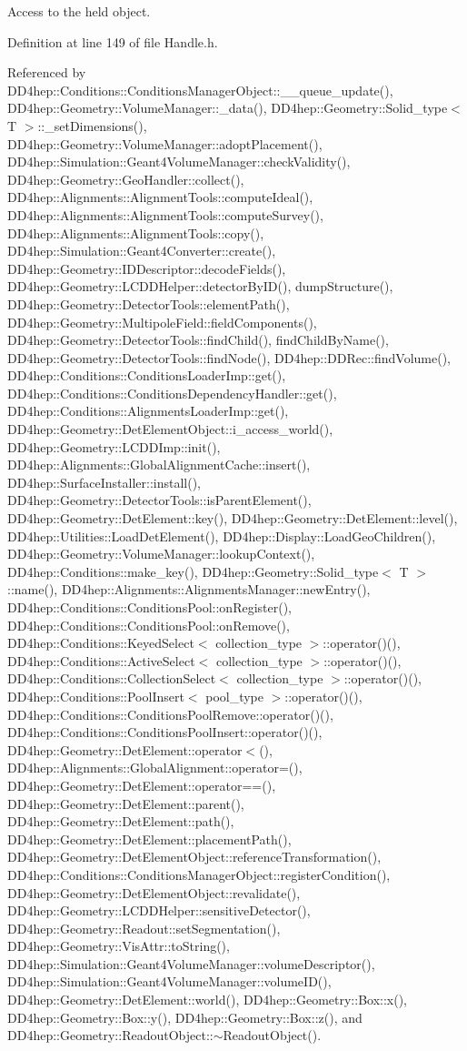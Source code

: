 Access to the held object. 

Definition at line 149 of file Handle.h.

Referenced by DD4hep::Conditions::ConditionsManagerObject::\_\-\_\-queue\_\-update(), DD4hep::Geometry::VolumeManager::\_\-data(), DD4hep::Geometry::Solid\_\-type$<$ T $>$::\_\-setDimensions(), DD4hep::Geometry::VolumeManager::adoptPlacement(), DD4hep::Simulation::Geant4VolumeManager::checkValidity(), DD4hep::Geometry::GeoHandler::collect(), DD4hep::Alignments::AlignmentTools::computeIdeal(), DD4hep::Alignments::AlignmentTools::computeSurvey(), DD4hep::Alignments::AlignmentTools::copy(), DD4hep::Simulation::Geant4Converter::create(), DD4hep::Geometry::IDDescriptor::decodeFields(), DD4hep::Geometry::LCDDHelper::detectorByID(), dumpStructure(), DD4hep::Geometry::DetectorTools::elementPath(), DD4hep::Geometry::MultipoleField::fieldComponents(), DD4hep::Geometry::DetectorTools::findChild(), findChildByName(), DD4hep::Geometry::DetectorTools::findNode(), DD4hep::DDRec::findVolume(), DD4hep::Conditions::ConditionsLoaderImp::get(), DD4hep::Conditions::ConditionsDependencyHandler::get(), DD4hep::Conditions::AlignmentsLoaderImp::get(), DD4hep::Geometry::DetElementObject::i\_\-access\_\-world(), DD4hep::Geometry::LCDDImp::init(), DD4hep::Alignments::GlobalAlignmentCache::insert(), DD4hep::SurfaceInstaller::install(), DD4hep::Geometry::DetectorTools::isParentElement(), DD4hep::Geometry::DetElement::key(), DD4hep::Geometry::DetElement::level(), DD4hep::Utilities::LoadDetElement(), DD4hep::Display::LoadGeoChildren(), DD4hep::Geometry::VolumeManager::lookupContext(), DD4hep::Conditions::make\_\-key(), DD4hep::Geometry::Solid\_\-type$<$ T $>$::name(), DD4hep::Alignments::AlignmentsManager::newEntry(), DD4hep::Conditions::ConditionsPool::onRegister(), DD4hep::Conditions::ConditionsPool::onRemove(), DD4hep::Conditions::KeyedSelect$<$ collection\_\-type $>$::operator()(), DD4hep::Conditions::ActiveSelect$<$ collection\_\-type $>$::operator()(), DD4hep::Conditions::CollectionSelect$<$ collection\_\-type $>$::operator()(), DD4hep::Conditions::PoolInsert$<$ pool\_\-type $>$::operator()(), DD4hep::Conditions::ConditionsPoolRemove::operator()(), DD4hep::Conditions::ConditionsPoolInsert::operator()(), DD4hep::Geometry::DetElement::operator$<$(), DD4hep::Alignments::GlobalAlignment::operator=(), DD4hep::Geometry::DetElement::operator==(), DD4hep::Geometry::DetElement::parent(), DD4hep::Geometry::DetElement::path(), DD4hep::Geometry::DetElement::placementPath(), DD4hep::Geometry::DetElementObject::referenceTransformation(), DD4hep::Conditions::ConditionsManagerObject::registerCondition(), DD4hep::Geometry::DetElementObject::revalidate(), DD4hep::Geometry::LCDDHelper::sensitiveDetector(), DD4hep::Geometry::Readout::setSegmentation(), DD4hep::Geometry::VisAttr::toString(), DD4hep::Simulation::Geant4VolumeManager::volumeDescriptor(), DD4hep::Simulation::Geant4VolumeManager::volumeID(), DD4hep::Geometry::DetElement::world(), DD4hep::Geometry::Box::x(), DD4hep::Geometry::Box::y(), DD4hep::Geometry::Box::z(), and DD4hep::Geometry::ReadoutObject::$\sim$ReadoutObject().\hypertarget{class_d_d4hep_1_1_handle_a664da2f5ac76434379046989853da656}{
}
